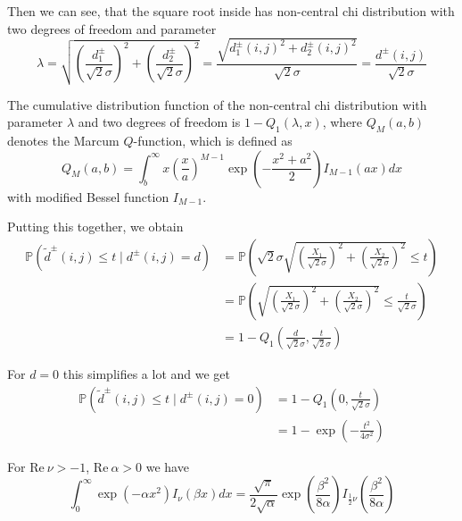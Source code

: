 \documentclass[a4paper,12pt]{article}
\theoremstyle{plain}
\theoremstyle{definition}
\theoremstyle{remark}
\begin{document}
Then we can see, that the square root inside has non-central chi distribution with two degrees of freedom and parameter
\begin{equation*}
	\lambda = \sqrt{\left( \frac{d_1^\pm}{\sqrt{2} \sigma} \right)^2 + \left( \frac{d_2^\pm}{\sqrt{2} \sigma} \right)^2} = \frac{\sqrt{d_1^\pm(i, j)^2 + d_2^\pm(i, j)^2}}{\sqrt{2} \sigma} = \frac{d^\pm(i, j)}{\sqrt{2} \sigma}
\end{equation*}

The cumulative distribution function of the non-central chi distribution with parameter $\lambda$ and two degrees of freedom is $1 - Q_1(\lambda, x)$, where $Q_M(a, b)$ denotes the Marcum $Q$-function, which is defined as
\begin{equation*}
	Q_M(a, b) = \int_b^\infty x \left( \frac{x}{a} \right)^{M-1} \exp \left( - \frac{x^2 + a^2}{2} \right) I_{M-1}(ax) dx
\end{equation*}
with modified Bessel function $I_{M-1}$.

Putting this together, we obtain
\begin{align*}
	\mathbb{P}(\tilde{d}^\pm(i, j) \leq t \mid d^\pm(i, j) = d) &= \mathbb{P}\left( \sqrt{2} \sigma \sqrt{\left( \frac{X_1}{\sqrt{2} \sigma} \right)^2 + \left( \frac{X_2}{\sqrt{2} \sigma} \right)^2} \leq t \right) \\
	&= \mathbb{P}\left( \sqrt{\left( \frac{X_1}{\sqrt{2} \sigma} \right)^2 + \left( \frac{X_2}{\sqrt{2} \sigma} \right)^2} \leq \frac{t}{\sqrt{2} \sigma} \right) \\
	&= 1 - Q_1 \left( \frac{d}{\sqrt{2} \sigma}, \frac{t}{\sqrt{2} \sigma} \right)
\end{align*}

For $d = 0$ this simplifies a lot and we get
\begin{align*}
	\mathbb{P}(\tilde{d}^\pm(i, j) \leq t \mid d^\pm(i, j) = 0) &= 1 - Q_1 \left( 0, \frac{t}{\sqrt{2} \sigma} \right) \\
	&= 1 - \exp \left( - \frac{t^2}{4 \sigma^2} \right)
\end{align*}

\newpage

For $\mathrm{Re} \ \nu > -1$, $\mathrm{Re} \ \alpha > 0$ we have
\begin{equation*}
	\int_0^\infty \exp \left( - \alpha x^2 \right) I_\nu ( \beta x ) dx = \frac{\sqrt{\pi}}{2 \sqrt{\alpha}} \exp \left( \frac{\beta^2}{8 \alpha} \right) I_{\frac{1}{2} \nu} \left( \frac{\beta^2}{8 \alpha} \right)
\end{equation*}
\end{document}
